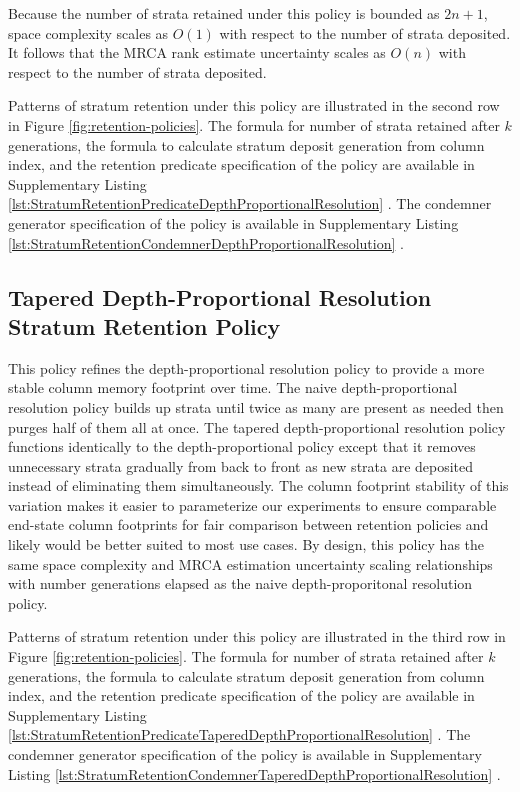 Because the number of strata retained under this policy is bounded as $2n+1$, space complexity scales as $O(1)$ with respect to the number of strata deposited.
It follows that the MRCA rank estimate uncertainty scales as $O(n)$ with respect to the number of strata deposited.

Patterns of stratum retention under this policy are illustrated in the second row in Figure \ref{fig:retention-policies}.
The formula for number of strata retained after $k$ generations, the formula to calculate stratum deposit generation from column index, and the retention predicate specification of the policy are available in Supplementary Listing \ref{lst:StratumRetentionPredicateDepthProportionalResolution} \citep{moreno2022hstratconceptsupplement}.
The condemner generator specification of the policy is available in Supplementary Listing \ref{lst:StratumRetentionCondemnerDepthProportionalResolution} \citep{moreno2022hstratconceptsupplement}.

\subsection{Tapered Depth-Proportional Resolution Stratum Retention Policy}

This policy refines the depth-proportional resolution policy to provide a more stable column memory footprint over time.
The naive depth-proportional resolution policy builds up strata until twice as many are present as needed then purges half of them all at once.
The tapered depth-proportional resolution policy functions identically to the depth-proportional policy except that it removes unnecessary strata gradually from back to front as new strata are deposited instead of eliminating them simultaneously.
The column footprint stability of this variation makes it easier to parameterize our experiments to ensure comparable end-state column footprints for fair comparison between retention policies and likely would be better suited to most use cases.
By design, this policy has the same space complexity and MRCA estimation uncertainty scaling relationships with number generations elapsed as the naive depth-proporitonal resolution policy.

Patterns of stratum retention under this policy are illustrated in the third row in Figure \ref{fig:retention-policies}.
The formula for number of strata retained after $k$ generations, the formula to calculate stratum deposit generation from column index, and the retention predicate specification of the policy are available in Supplementary Listing \ref{lst:StratumRetentionPredicateTaperedDepthProportionalResolution} \citep{moreno2022hstratconceptsupplement}.
The condemner generator specification of the policy is available in Supplementary Listing \ref{lst:StratumRetentionCondemnerTaperedDepthProportionalResolution} \citep{moreno2022hstratconceptsupplement}.

